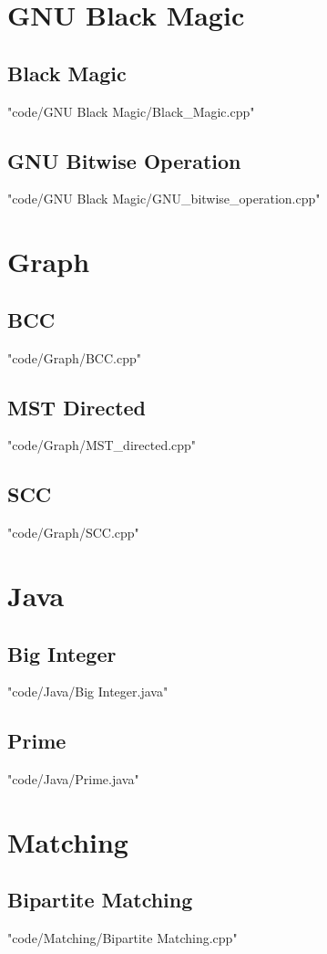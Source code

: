 \documentclass [landscape,8pt,a4paper,twocolumn]{article}
\begin{document}
\section{GNU Black Magic}
\subsection{Black Magic}
 {"code/GNU Black Magic/Black_Magic.cpp"}
\subsection{GNU Bitwise Operation}
 {"code/GNU Black Magic/GNU_bitwise_operation.cpp"}
\section{Graph}
\subsection{BCC}
 {"code/Graph/BCC.cpp"}
\subsection{MST Directed}
 {"code/Graph/MST_directed.cpp"}
\subsection{SCC}
 {"code/Graph/SCC.cpp"}
\section{Java}
\subsection{Big Integer}
 {"code/Java/Big Integer.java"}
\subsection{Prime}
 {"code/Java/Prime.java"}
\section{Matching}
\subsection{Bipartite Matching}
 {"code/Matching/Bipartite Matching.cpp"}
\end{document}
